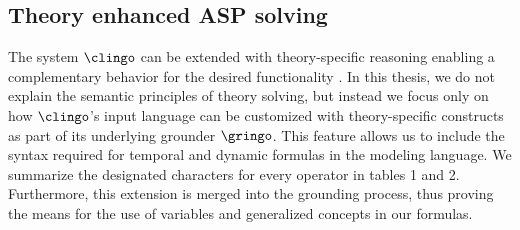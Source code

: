 \subsection{Theory enhanced ASP solving  }


The system $\clingo$ can be extended with theory-specific reasoning enabling a complementary behavior for the desired functionality \cite{kascwa17a}. In this thesis, we do not explain the semantic principles of theory solving, but instead we focus only on how $\clingo$'s input language can be customized with theory-specific constructs as part of its underlying grounder $\gringo$. This feature allows us to include the syntax required for temporal and dynamic formulas in the modeling language. We summarize the designated characters for every operator in tables 1 and 2. Furthermore, this extension is merged into the grounding process, thus proving the means for the use of variables and generalized concepts in our formulas.

